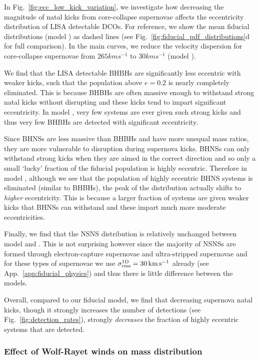 In Fig.~\ref{fig:ecc_low_kick_variation}, we investigate how decreasing the magnitude of natal kicks from core-collapse supernovae affects the eccentricity distribution of LISA detectable DCOs. For reference, we show the mean fiducial distributions (model \modFid{}) as dashed lines (see Fig.~\ref{fig:fiducial_pdf_distributions}d for full comparison). In the main curves, we reduce the velocity dispersion for core-collapse supernovae from $265 \unit{km}{s^{-1}}$ to $30 \unit{km}{s^{-1}}$ (model \modSigLower{}).

We find that the LISA detectable BHBHs are significantly less eccentric with weaker kicks, such that the population above $e = 0.2$ is nearly completely eliminated. This is because BHBHs are often massive enough to withstand strong natal kicks without disrupting and these kicks tend to impart significant eccentricity. In model \modSigLower{}, very few systems are ever given such strong kicks and thus very few BHBHs are detected with significant eccentricity.

Since BHNSs are less massive than BHBHs and have more unequal mass ratios, they are more vulnerable to disruption during supernova kicks. BHNSs can only withstand strong kicks when they are aimed in the correct direction and so only a small `lucky' fraction of the fiducial population is highly eccentric. Therefore in model \modSigLower{}, although we see that the population of highly eccentric BHNS systems is eliminated (similar to BHBHs), the peak of the distribution actually shifts to \textit{higher} eccentricity. This is because a larger fraction of systems are given weaker kicks that BHNSs can withstand and these impart much more moderate eccentricities.

Finally, we find that the NSNS distribution is relatively unchanged between model \modFid{} and \modSigLower{}. This is not surprising however since the majority of NSNSs are formed through electron-capture supernovae and ultra-stripped supernovae and for these types of supernovae we use $\sigma^{\rm 1D}_{\rm rms} = 30 \unit{km}{s^{-1}}$ already (see App.~\ref{app:fiducial_physics}) and thus there is little difference between the models.

Overall, compared to our fiducial model, we find that decreasing supernova natal kicks, though it strongly increases the number of detections (see Fig.~\ref{fig:detection_rates}), strongly \textit{decreases} the fraction of highly eccentric systems that are detected.

\subsubsection{Effect of Wolf-Rayet winds on mass distribution}

